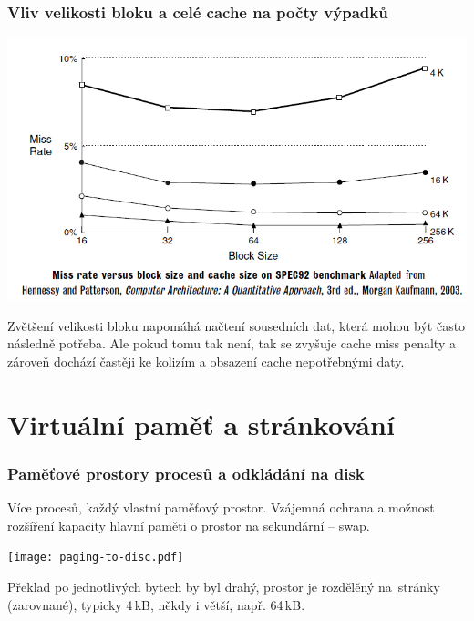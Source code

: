 \documentclass{beamer}
\begin{document}
\begin{frame}
\frametitle{Vliv velikosti bloku a celé cache na počty výpadků}

{
\centering

\includegraphics[width=0.75\linewidth]{fig/cache-size-vs-block.png}

}

Zvětšení velikosti bloku napomáhá načtení sousedních dat, která mohou být často následně potřeba.
Ale pokud tomu tak není, tak se zvyšuje cache miss penalty a zároveň dochází častěji ke kolizím
a obsazení cache nepotřebnými daty.

\end{frame}

\section{Virtuální paměť a stránkování}

\begin{frame}
\frametitle{Paměťové prostory procesů a odkládání na disk}

Více procesů, každý vlastní paměťový prostor. Vzájemná ochrana
a možnost rozšíření kapacity hlavní paměti o prostor na sekundární -- swap.

{
\centering

\texttt{[image: paging-to-disc.pdf]}

}

Překlad po jednotlivých bytech by byl drahý, prostor je rozdělěný na~stránky
(zarovnané), typicky 4\,kB, někdy i větší, např. 64\,kB.

\end{frame}
\end{document}
